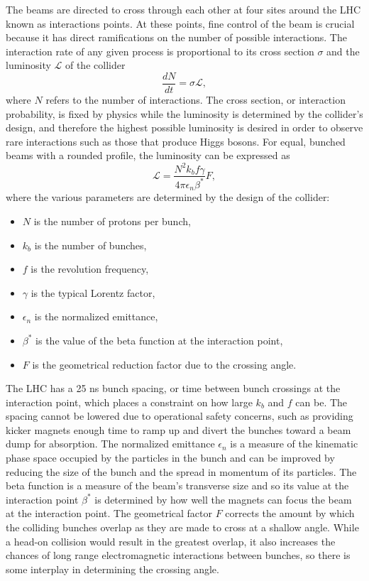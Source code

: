 The beams are directed to cross through each other at four sites around the LHC known as interactions points. At these points, fine control of the beam is crucial because it has direct ramifications on the number of possible interactions. The interaction rate of any given process is proportional to its cross section $\sigma$ and the luminosity $\mathcal{L}$ of the collider
\begin{equation}
  \frac{dN}{dt} = \sigma\mathcal{L},
\end{equation}
where $N$ refers to the number of interactions. The cross section, or interaction probability, is fixed by physics while the luminosity is determined by the collider's design, and therefore the highest possible luminosity is desired in order to observe rare interactions such as those that produce Higgs bosons. For equal, bunched beams with a rounded profile, the luminosity can be expressed as
\begin{equation}
  \mathcal{L} = \frac{ N^{2} k_{b} f \gamma }{ 4 \pi \epsilon_{n} \beta^{\ast} } F,
\end{equation}
where the various parameters are determined by the design of the collider:
\begin{itemize}
  \item $N$ is the number of protons per bunch,
  \item $k_{b}$ is the number of bunches,
  \item $f$ is the revolution frequency,
  \item $\gamma$ is the typical Lorentz factor,
  \item $\epsilon_{n}$ is the normalized emittance,
  \item $\beta^{\ast}$ is the value of the beta function at the interaction point,
  \item $F$ is the geometrical reduction factor due to the crossing angle.\cite{lumiequation}
\end{itemize}

The LHC has a 25 ns bunch spacing, or time between bunch crossings at the interaction point, which places a constraint on how large $k_{b}$ and $f$ can be. The spacing cannot be lowered due to operational safety concerns, such as providing kicker magnets enough time to ramp up and divert the bunches toward a beam dump for absorption. The normalized emittance $\epsilon_{n}$ is a measure of the kinematic phase space occupied by the particles in the bunch and can be improved by reducing the size of the bunch and the spread in momentum of its particles. The beta function is a measure of the beam's transverse size and so its value at the interaction point $\beta^{\ast}$ is determined by how well the magnets can focus the beam at the interaction point. The geometrical factor $F$ corrects the amount by which the colliding bunches overlap as they are made to cross at a shallow angle. While a head-on collision would result in the greatest overlap, it also increases the chances of long range electromagnetic interactions between bunches, so there is some interplay in determining the crossing angle.

